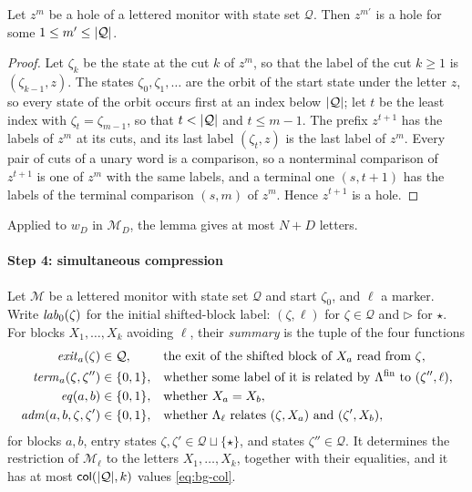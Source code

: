 \begin{lemma}\label{lem:bg-unary}
Let $z^m$ be a hole of a lettered monitor with state set $\mathcal Q$. Then
$z^{m'}$ is a hole for some $1\le m'\le\lvert \mathcal Q\rvert$.
\end{lemma}
\begin{proof}
Let $\zeta_k$ be the state at the cut $k$ of $z^m$, so that the label of the
cut $k\ge1$ is $(\zeta_{k-1},z)$. The states $\zeta_0,\zeta_1,\ldots$ are the
orbit of the start state under the letter $z$, so every state of the orbit
occurs first at an index below $\lvert \mathcal Q\rvert$; let $t$ be the least index
with $\zeta_t=\zeta_{m-1}$, so that $t<\lvert \mathcal Q\rvert$ and $t\le m-1$. The
prefix $z^{t+1}$ has the labels of $z^m$ at its cuts, and its last label
$(\zeta_t,z)$ is the last label of $z^m$. Every pair of cuts of a unary word
is a comparison, so a nonterminal comparison of $z^{t+1}$ is one of $z^m$ with
the same labels, and a terminal one $(s,t+1)$ has the labels of the terminal
comparison $(s,m)$ of $z^m$. Hence $z^{t+1}$ is a hole.
\end{proof}

Applied to $w_D$ in $\mathcal M_D$, the lemma gives at most $N+D$ letters.

\paragraph{Step 4: simultaneous compression}
Let $\mathcal M$ be a lettered monitor with state set $\mathcal Q$ and start
$\zeta_0$, and $\ell$ a marker. Write $\mathit{lab}_0(\zeta)$ for the initial
shifted-block label: $(\zeta,\ell)$ for $\zeta\in\mathcal Q$ and $\triangleright$
for $\star$. For blocks $X_1,\ldots,X_k$ avoiding $\ell$, their \emph{summary}
is the tuple of the four functions
\[
\begin{aligned}
 \mathit{exit}_a(\zeta)&\in\mathcal Q,&&\text{the exit of the shifted block of }X_a
   \text{ read from }\zeta,\\
 \mathit{term}_a(\zeta,\zeta'')&\in\{0,1\},&&\text{whether some label of it is related
   by }\Lambda^{\mathrm{fin}}\text{ to }(\zeta'',\ell),\\
 \mathit{eq}(a,b)&\in\{0,1\},&&\text{whether }X_a=X_b,\\
 \mathit{adm}(a,b,\zeta,\zeta')&\in\{0,1\},&&\text{whether }\Lambda_\ell\text{ relates }
   (\zeta,X_a)\text{ and }(\zeta',X_b),
\end{aligned}
\]
for blocks $a,b$, entry states $\zeta,\zeta'\in\mathcal Q\sqcup\{\star\}$, and
states $\zeta''\in\mathcal Q$. It determines the restriction of $\mathcal M_\ell$
to the letters $X_1,\ldots,X_k$, together with their equalities, and it has at
most $\mathsf{col}(\lvert \mathcal Q\rvert,k)$ values \cref{eq:bg-col}.

